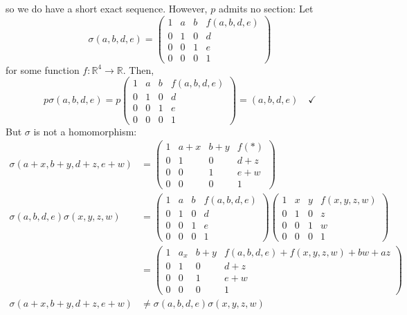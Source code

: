 \documentclass[12pt]{article}
\newcommand{\R}{\mathbb{R}}
\begin{document}
        so we do have a short exact sequence. However, $p$ admits no section: Let 
        \[\sigma(a, b, d, e) = \begin{pmatrix}
            1 & a & b & f(a, b, d, e)\\ 
            0 & 1 & 0 & d\\ 
            0 & 0 & 1 & e\\ 
            0 & 0 & 0 & 1
        \end{pmatrix}\]
        for some function $f: \R^4 \to \R$. Then, 
        \[p\sigma(a, b, d, e) = p\begin{pmatrix}
            1 & a & b & f(a, b, d, e)\\ 
            0 & 1 & 0 & d\\ 
            0 & 0 & 1 & e\\ 
            0 & 0 & 0 & 1
        \end{pmatrix} = (a, b, d, e) \quad \checkmark\] 
        But $\sigma$ is not a homomorphism:
        \begin{align*}
            \sigma(a + x, b + y, d + z, e + w) &= \begin{pmatrix}
                1 & a+x & b+y & f(*)\\ 
                0 & 1 & 0 & d+z\\ 
                0 & 0 & 1 & e+w\\ 
                0 & 0 & 0 & 1
            \end{pmatrix}\\ 
            \sigma(a, b, d, e)\sigma(x, y, z, w) &= \begin{pmatrix}
                1 & a & b & f(a, b, d, e)\\ 
                0 & 1 & 0 & d\\ 
                0 & 0 & 1 & e\\ 
                0 & 0 & 0 & 1
            \end{pmatrix} \begin{pmatrix}
                1 & x & y & f(x, y, z, w)\\ 
                0 & 1 & 0 & z\\ 
                0 & 0 & 1 & w\\ 
                0 & 0 & 0 & 1
            \end{pmatrix}\\ 
            &= \begin{pmatrix}
                1 & a_x & b+y & f(a, b, d, e) + f(x, y, z, w) + bw + az\\ 
                0 & 1 & 0 & d+z\\ 
                0 & 0 & 1 & e+w\\ 
                0 & 0 & 0 & 1
            \end{pmatrix}\\ 
            \sigma(a + x, b + y, d + z, e + w) &\neq \sigma(a, b, d, e)\sigma(x, y, z, w)
        \end{align*}
\end{document}
